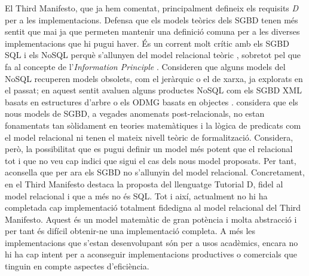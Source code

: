 El Third Manifesto, que ja hem comentat, principalment defineix els
requisits \emph{D} per a les implementacions. Defensa que els models teòrics
dels \gls{SGBD} tenen més sentit que mai ja que permeten mantenir una
definició comuna per a les diverses implementacions que hi pugui
haver.  És un corrent molt crític amb els \gls{SGBD} \gls{SQL} i els NoSQL perquè
s'allunyen del model relacional
teòric \parencite{datedarwen13:notosql_notonosql}, sobretot pel que fa
al concepte de l'\emph{Information Principle} \parencite[part
7]{date06}. Consideren que alguns models del NoSQL recuperen models
obsolets, com el jeràrquic o el de xarxa, ja explorats en el passat;
en aquest sentit avaluen alguns productes NoSQL com els \gls{SGBD} \gls{XML}
basats en estructures
d'arbre \parencite[cap.~14]{date06} \parencite[cap.~27]{date04:introduction8}
o els ODMG basats en objectes \parencite[cap.~27]{date06}.
\textcite[cap.~21--25]{date06} considera que els nous models de \gls{SGBD},
a vegades anomenats post-relacionals, no estan fonamentats tan sòlidament
en teories matemàtiques i la lògica de predicats com el model
relacional ni tenen el mateix nivell teòric de
formalització. %
Considera, però, la possibilitat que es pugui definir un model més
potent que el relacional tot i que no veu cap indici que sigui el cas
dels nous model proposats. Per tant, aconsella que per ara els \gls{SGBD} no
s'allunyin del model relacional. %
Concretament, en el Third Manifesto destaca la proposta del
llenguatge Tutorial D, fidel al model relacional i que a més no és
\gls{SQL}. Tot i així, actualment no hi ha completada cap implementació
totalment fidedigna al model relacional del Third Manifesto. Aquest és
un model matemàtic de gran potència i molta abstracció i per tant és
difícil obtenir-ne una implementació completa. A més les
implementacions que s'estan desenvolupant són per a usos acadèmics,
encara no hi ha cap intent per a aconseguir implementacions
productives o comercials que tinguin en compte aspectes d'eficiència.




